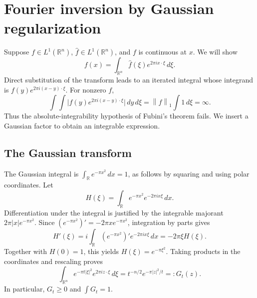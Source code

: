 \documentclass[11pt]{article}
\numberwithin{equation}{section}
\theoremstyle{definition}
\theoremstyle{remark}
\newcommand{\R}{\mathbb R}
\newcommand{\dd}{\,d}
\newcommand{\norm}[1]{\left\|#1\right\|}
\newcommand{\wh}[1]{\widehat{#1}}
\begin{document}
\section{Fourier inversion by Gaussian regularization}\label{app:inversion}
Suppose \(f\in L^1(\R^n)\), \(\wh f\in L^1(\R^n)\), and \(f\) is continuous at \(x\). We will show
\begin{equation}\label{eq:inversion}
 f(x)=\int_{\R^n}\wh f(\xi)e^{2\pi i x\cdot\xi}\dd\xi.
\end{equation}
Direct substitution of the transform leads to an iterated integral whose integrand is \(f(y)e^{2\pi i(x-y)\cdot\xi}\). For nonzero \(f\),
\[
 \int\!\int\bigl|f(y)e^{2\pi i(x-y)\cdot\xi}\bigr|\dd y\dd\xi
       =\norm f_1\int1\dd\xi=\infty.
\]
Thus the absolute-integrability hypothesis of Fubini's theorem fails. We insert a Gaussian factor to obtain an integrable expression.

\subsection{The Gaussian transform}
The Gaussian integral is \(\int_\R e^{-\pi x^2}\dd x=1\), as follows by squaring and using polar coordinates. Let
\[
 H(\xi)=\int_\R e^{-\pi x^2}e^{-2\pi i x\xi}\dd x.
\]
Differentiation under the integral is justified by the integrable majorant \(2\pi|x|e^{-\pi x^2}\). Since
\((e^{-\pi x^2})'=-2\pi x e^{-\pi x^2}\), integration by parts gives
\[
 H'(\xi)=i\int_\R(e^{-\pi x^2})'e^{-2\pi i x\xi}\dd x
         =-2\pi\xi H(\xi).
\]
Together with \(H(0)=1\), this yields \(H(\xi)=e^{-\pi\xi^2}\). Taking products in the coordinates and rescaling proves
\begin{equation}\label{eq:gaussiantransform}
 \int_{\R^n}e^{-\pi t|\xi|^2}e^{2\pi i z\cdot\xi}\dd\xi
       =t^{-n/2}e^{-\pi|z|^2/t}=:G_t(z).
\end{equation}
In particular, \(G_t\ge0\) and \(\int G_t=1\).
\end{document}
